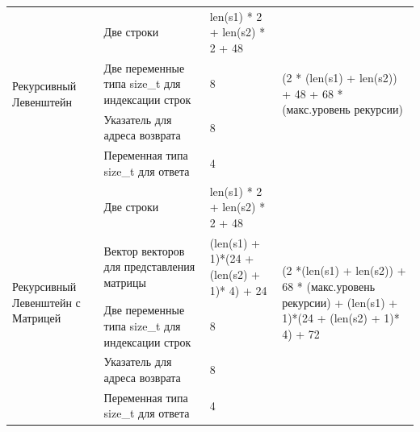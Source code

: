 \documentclass[12pt,a4paper,oneside]{report}
\begin{document}
\begin{longtable}[H]{|p{3cm}|p{3cm}|p{5cm}|p{5cm}|}
	\hline
	\multirow{4}{3cm}{Рекурсивный Левенштейн}                                                                                                                                                                  & Две строки                                 & len(s1) * 2 + len(s2) * 2   + 48                    & \multirow{4}{5cm}{(2 * (len(s1) + len(s2)) + 48 + 68 * (макс.уровень рекурсии)}                                          \\ 
	\cline{2-3}
	& Две переменные типа size\_t   для индексации строк                    & 8                                            &                                                                                         \\ 
	\cline{2-3}
	& Указатель для адреса возврата                              & 8                                             &                                                                                         \\ 
	\cline{2-3}
	& Переменная типа size\_t  для ответа                             & 4                                              &                                                                                         \\ 
	\hline
	\multirow{6}{3cm}{Рекурсивный Левенштейн с Матрицей}                                                                                                                                                       & Две строки                                  & len(s1) * 2 + len(s2) * 2  + 48                & \multirow{6}{5cm}{(2 *(len(s1) + len(s2)) + 68 * (макс.уровень рекурсии) + (len(s1) + 1)*(24 + (len(s2) + 1)* 4) + 72 }   \\ 
	\cline{2-3}
	& Вектор векторов для представления матрицы&  (len(s1) + 1)*(24 + (len(s2) + 1)* 4)              + 24                             &                                                                                         \\ 
	\cline{2-3}
	& Две переменные типа size\_t   для индексации строк                  & 8                                            &                                                                                         \\ 
	\cline{2-3}
	& Указатель для адреса возврата                              & 8                                             &                                                                                         \\ 
	\cline{2-3}
	& Переменная типа size\_t  для ответа                             & 4                                             &                                                                                         \\ 
	\cline{2-3}


\end{longtable}
\end{document}
